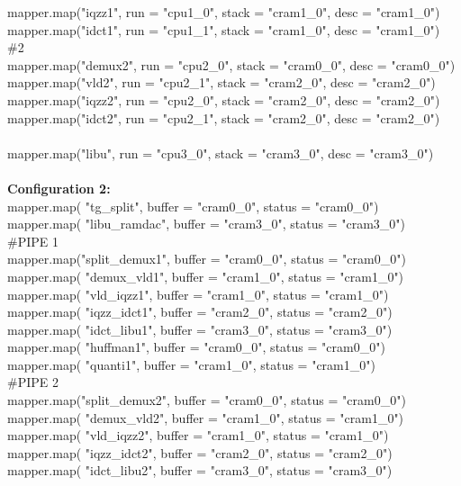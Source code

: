 \documentclass[12pt]{article}
\begin{document}
mapper.map("iqzz1",  run = "cpu1\_0", stack = "cram1\_0", desc  = "cram1\_0")\\
mapper.map("idct1",  run = "cpu1\_1", stack = "cram1\_0", desc  = "cram1\_0")\\
\#2\\
mapper.map("demux2", run = "cpu2\_0", stack = "cram0\_0", desc  = "cram0\_0")\\
mapper.map("vld2",   run = "cpu2\_1", stack = "cram2\_0", desc  = "cram2\_0")\\
mapper.map("iqzz2",  run = "cpu2\_0", stack = "cram2\_0", desc  = "cram2\_0")\\
mapper.map("idct2",  run = "cpu2\_1", stack = "cram2\_0", desc  = "cram2\_0")\\
\\
mapper.map("libu",   run = "cpu3\_0", stack = "cram3\_0", desc  = "cram3\_0")\\
\\
\textbf{Configuration 2:}\\
mapper.map( "tg\_split",    buffer = "cram0\_0", status = "cram0\_0")\\
mapper.map( "libu\_ramdac", buffer = "cram3\_0", status = "cram3\_0")\\
\#PIPE 1\\
mapper.map("split\_demux1", buffer = "cram0\_0", status = "cram0\_0")\\
mapper.map( "demux\_vld1",  buffer = "cram1\_0", status = "cram1\_0")\\
mapper.map( "vld\_iqzz1",   buffer = "cram1\_0", status = "cram1\_0")\\
mapper.map( "iqzz\_idct1",  buffer = "cram2\_0", status = "cram2\_0")\\
mapper.map( "idct\_libu1",  buffer = "cram3\_0", status = "cram3\_0")\\
mapper.map( "huffman1",    buffer = "cram0\_0", status = "cram0\_0")\\
mapper.map( "quanti1",     buffer = "cram1\_0", status = "cram1\_0")\\
\#PIPE 2\\
mapper.map("split\_demux2", buffer = "cram0\_0", status = "cram0\_0")\\
mapper.map( "demux\_vld2",  buffer = "cram1\_0", status = "cram1\_0")\\
mapper.map( "vld\_iqzz2",   buffer = "cram1\_0", status = "cram1\_0")\\
mapper.map( "iqzz\_idct2",  buffer = "cram2\_0", status = "cram2\_0")\\
mapper.map( "idct\_libu2",  buffer = "cram3\_0", status = "cram3\_0")\\
\end{document}
